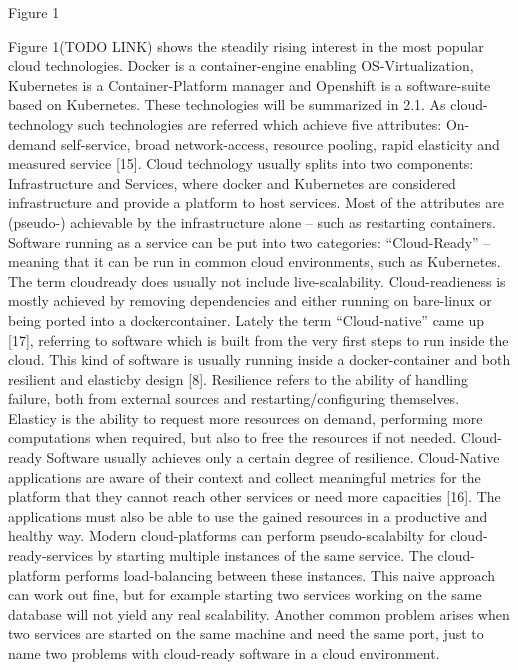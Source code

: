\documentclass[utf8,biblatex]{lni}
\begin{document}
Figure 1 

Figure 1(TODO LINK) shows the steadily rising interest in the most popular cloud technologies. 
Docker is a container-engine enabling OS-Virtualization, Kubernetes is a Container-Platform manager and Openshift is a software-suite based on Kubernetes. 
These technologies will be summarized in 2.1.  
As cloud-technology such technologies are referred which achieve five attributes: 
On-demand self-service, broad network-access, resource pooling, rapid elasticity and measured service [15]. 
Cloud technology usually splits into two components:  Infrastructure  and  Services,  where  docker and Kubernetes are considered infrastructure and provide a  platform  to  host  services.  
Most  of  the  attributes  are (pseudo-) achievable by the infrastructure alone – such as restarting containers. 
Software running as a service can be put into two categories: 
“Cloud-Ready” – meaning that it can be run in common cloud environments, such as Kubernetes. 
The term cloudready  does  usually  not  include  live-scalability. Cloud-readieness is mostly achieved by removing dependencies and either running on bare-linux or being ported into a dockercontainer. 
Lately the term “Cloud-native” came up [17], referring to software which is built from the very first steps to run inside the cloud. This kind of software is usually running inside a docker-container and both resilient and elasticby design [8].  
Resilience refers to the ability of handling failure, both from external sources and restarting/configuring themselves.  
Elasticy is the ability to request more resources on demand, performing more computations when required, but also to free the resources if not needed. 
Cloud-ready Software usually achieves only a certain degree of resilience.   
Cloud-Native applications are aware of their context and collect meaningful metrics for the platform that they cannot reach other services or need more capacities [16]. 
The applications must also be able to use the gained resources in a productive and healthy way.  
Modern  cloud-platforms  can  perform  pseudo-scalabilty for cloud-ready-services by starting multiple instances of the same service. 
The cloud-platform performs load-balancing between these instances. 
This naive approach can work out fine, but for example starting two services working on the same database will not yield any real scalability. 
Another common problem arises when two services are started on the same machine and need the same port, just to name two problems with cloud-ready  software in a cloud environment. 
\end{document}
